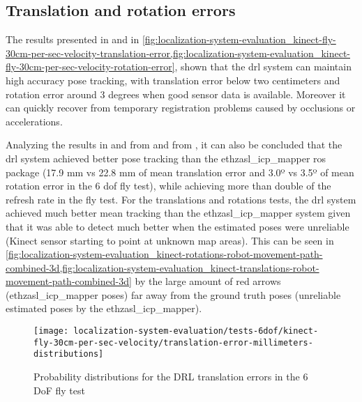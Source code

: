 \subsection{Translation and rotation errors}

The results presented in  and in \cref{fig:localization-system-evaluation_kinect-fly-30cm-per-sec-velocity-translation-error,fig:localization-system-evaluation_kinect-fly-30cm-per-sec-velocity-rotation-error}, shown that the \gls{drl} system can maintain high accuracy pose tracking, with translation error below two centimeters and rotation error around 3 degrees when good sensor data is available. Moreover it can quickly recover from temporary registration problems caused by occlusions or accelerations.

Analyzing the results in  and from  and from , it can also be concluded that the \gls{drl} system achieved better pose tracking than the ethzasl\_icp\_mapper \gls{ros} package (17.9 mm vs 22.8 mm of mean translation error and 3.0º vs 3.5º of mean rotation error in the 6 \gls{dof} fly test), while achieving more than double of the refresh rate in the fly test. For the translations and rotations tests, the \gls{drl} system achieved much better mean tracking than the ethzasl\_icp\_mapper system given that it was able to detect much better when the estimated poses were unreliable (Kinect sensor starting to point at unknown map areas). This can be seen in \cref{fig:localization-system-evaluation_kinect-rotations-robot-movement-path-combined-3d,fig:localization-system-evaluation_kinect-translations-robot-movement-path-combined-3d} by the large amount of red arrows (ethzasl\_icp\_mapper poses) far away from the ground truth poses (unreliable estimated poses by the ethzasl\_icp\_mapper).




\begin{figure}[H]
	\centering
	\texttt{[image: localization-system-evaluation/tests-6dof/kinect-fly-30cm-per-sec-velocity/translation-error-millimeters-distributions]}
	\caption{Probability distributions for the DRL translation errors in the 6 DoF fly test}
	\label{fig:localization-system-evaluation_kinect-fly-30cm-per-sec-velocity-translation-error}
\end{figure}


